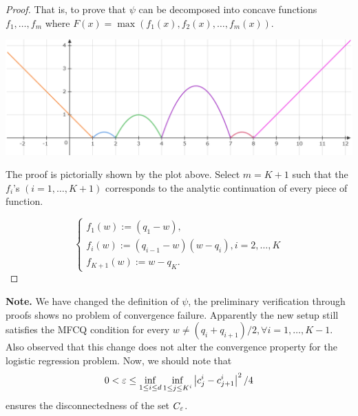 \documentclass[10pt,a4paper]{article}
\begin{document}

\begin{proof}
     That is, to prove that $\psi$ can be decomposed into concave functions $f_1, \ldots, f_m$ where $F(x)=\max(f_1(x), f_2(x), \ldots, f_m(x))$.

     \begin{center}
          \includegraphics[width=0.5\linewidth]{psi.png}
     \end{center}

     The proof is pictorially shown by the plot above. Select $m=K+1$ such that the $f_i$'s $(i=1, \ldots, K+1)$ corresponds to the analytic continuation of every piece of function.

     $$\begin{cases}f_1(w):=(q_{1}-w),\\f_{i}(w):=(q_{i-1}-w)(w-q_{i}), i=2,\ldots, K\\f_{K+1}(w):=w-q_{K}.\end{cases}$$
\end{proof}

\textbf{Note.} We have changed the definition of $\psi$, the preliminary verification through proofs shows no problem of convergence failure. Apparently the new setup still satisfies the MFCQ condition for every $w\neq (q_i+q_{i+1})/2, \forall i=1, \ldots, K-1$. Also observed that this change does not alter the convergence property for the logistic regression problem. Now, we should note that $$0<\varepsilon\leq \inf\limits_{1\leq i\leq d}\inf\limits_{1\leq j\leq K^i} \left| c_j^i-c_{j+1}^i \right|^2/4$$ ensures the disconnectedness of the set $C_\varepsilon$.
\end{document}

